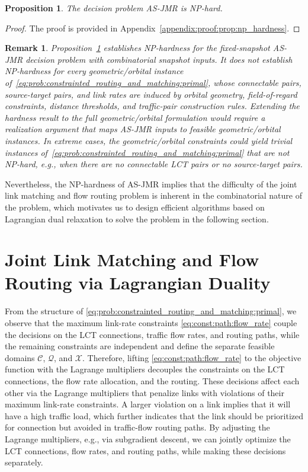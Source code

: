 \documentclass[journal]{IEEEtran}
\newtheorem{rem}{Remark}
\newtheorem{prop}{Proposition}
\begin{document}
\begin{prop}\label{prop:np_hardness}
The decision problem AS-JMR is NP-hard.
\end{prop}

\begin{proof}
  The proof is provided in Appendix~\ref{appendix:proof:prop:np_hardness}.
\end{proof}


\begin{rem}
Proposition~\ref{prop:np_hardness} establishes NP-hardness for the fixed-snapshot AS-JMR decision problem with combinatorial snapshot inputs. It does not establish NP-hardness for every geometric/orbital instance of~\eqref{eq:prob:constrainted_routing_and_matching:primal}, whose connectable pairs, source-target pairs, and link rates are induced by orbital geometry, field-of-regard constraints, distance thresholds, and traffic-pair construction rules. Extending the hardness result to the full geometric/orbital formulation would require a realization argument that maps AS-JMR inputs to feasible geometric/orbital instances.
In extreme cases, the geometric/orbital constraints could yield trivial instances of~\eqref{eq:prob:constrainted_routing_and_matching:primal} that are not NP-hard, e.g., when there are no connectable LCT pairs or no source-target pairs.
\end{rem}
Nevertheless, the NP-hardness of AS-JMR implies that the difficulty of the joint link matching and flow routing problem is inherent in the combinatorial nature of the problem, which motivates us to design efficient algorithms based on Lagrangian dual relaxation to solve the problem in the following section.

\section{Joint Link Matching and Flow Routing via Lagrangian Duality}\label{sec:lagrangian_dual_relaxation}
From the structure of \eqref{eq:prob:constrainted_routing_and_matching:primal}, we observe that the maximum link-rate constraints \eqref{eq:const:path:flow_rate} couple the decisions on the LCT connections, traffic flow rates, and routing paths, while the remaining constraints are independent and define the separate feasible domains $\mathcal{C}$, $\mathcal{Q}$, and $\mathcal{X}$.
Therefore, lifting \eqref{eq:const:path:flow_rate} to the objective function with the Lagrange multipliers decouples the constraints on the LCT connections, the flow rate allocation, and the routing.
These decisions affect each other via the Lagrange multipliers that penalize links with violations of their maximum link-rate constraints. 
A larger violation on a link implies that it will have a high traffic load, which further indicates that the link should be prioritized for connection but avoided in traffic-flow routing paths.
By adjusting the Lagrange multipliers, e.g., via subgradient descent, we can jointly optimize the LCT connections, flow rates, and routing paths, while making these decisions separately.
\end{document}
